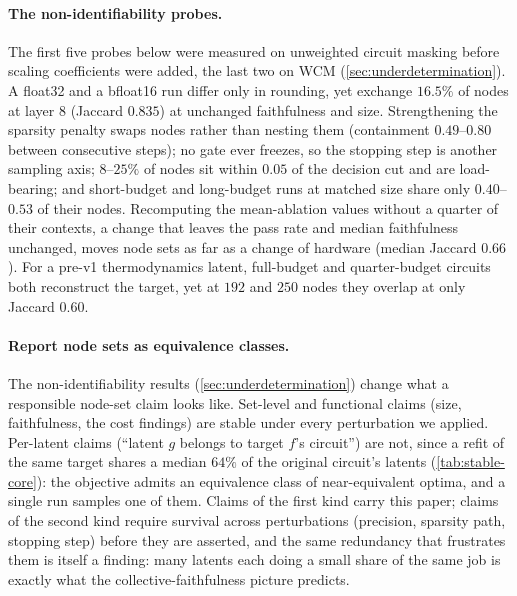 \documentclass[10pt]{article}
\begin{document}
\paragraph{The non-identifiability probes.}
The first five probes below were measured on unweighted circuit masking before scaling coefficients were added, the last two on WCM (\cref{sec:underdetermination}).
A float32 and a bfloat16 run differ only in rounding, yet exchange $16.5\%$ of nodes at layer 8 (Jaccard $0.835$) at unchanged faithfulness and size.
Strengthening the sparsity penalty swaps nodes rather than nesting them (containment $0.49$--$0.80$ between consecutive steps); no gate ever freezes, so the stopping step is another sampling axis; $8$--$25\%$ of nodes sit within $0.05$ of the decision cut and are load-bearing; and short-budget and long-budget runs at matched size share only $0.40$--$0.53$ of their nodes.
Recomputing the mean-ablation values without a quarter of their contexts, a change that leaves the pass rate and median faithfulness unchanged, moves node sets as far as a change of hardware (median Jaccard $0.66$).
For a pre-v1 thermodynamics latent, full-budget and quarter-budget circuits both reconstruct the target, yet at $192$ and $250$ nodes they overlap at only Jaccard $0.60$.

\paragraph{Report node sets as equivalence classes.}
The non-identifiability results (\cref{sec:underdetermination}) change what a responsible node-set claim looks like.
Set-level and functional claims (size, faithfulness, the cost findings) are stable under every perturbation we applied.
Per-latent claims (``latent $g$ belongs to target $f$'s circuit'') are not, since a refit of the same target shares a median $64\%$ of the original circuit's latents (\cref{tab:stable-core}): the objective admits an equivalence class of near-equivalent optima, and a single run samples one of them.
Claims of the first kind carry this paper; claims of the second kind require survival across perturbations (precision, sparsity path, stopping step) before they are asserted, and the same redundancy that frustrates them is itself a finding: many latents each doing a small share of the same job is exactly what the collective-faithfulness picture predicts.
\end{document}
